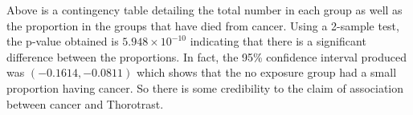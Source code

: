 \documentclass[12pt, onesided]{article}
\begin{document}
Above is a contingency table detailing the total number in each group as well as the proportion in the groups that have died from cancer. Using a 2-sample test, the p-value obtained is $5.948 \times 10^{-10}$ indicating that there is a significant difference between the proportions. In fact, the 95\% confidence interval produced was $(-0.1614, -0.0811)$ which shows that the no exposure group had a small proportion having cancer. So there is some credibility to the claim of association between cancer and Thorotrast.
\end{document}
